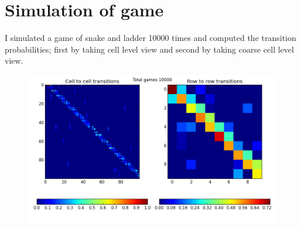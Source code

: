 \documentclass[a4paper,10pt]{article}
\begin{document}
\appendix
\section{Simulation of game}

I simulated a game of snake and ladder 10000 times and
computed the transition probabilities; first by taking cell level view and
second by taking coarse cell level view.

\begin{figure}[ht!]
\begin{center}
    \includegraphics[width=1\textwidth]{./snake_and_ladder.py.png}
\end{center}
\caption{}
\label{fig:}
\end{figure}
\end{document}
